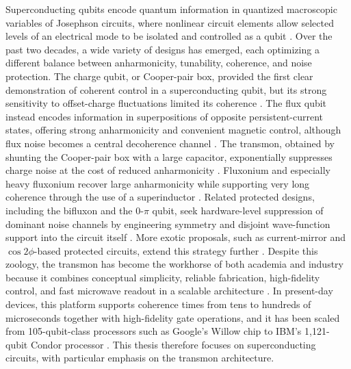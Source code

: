 Superconducting qubits encode quantum information in quantized macroscopic variables of Josephson circuits, where nonlinear circuit elements allow selected levels of an electrical mode to be isolated and controlled as a qubit \cite{Krantz2019,Kjaergaard2020}. Over the past two decades, a wide variety of designs has emerged, each optimizing a different balance between anharmonicity, tunability, coherence, and noise protection. The charge qubit, or Cooper-pair box, provided the first clear demonstration of coherent control in a superconducting qubit, but its strong sensitivity to offset-charge fluctuations limited its coherence \cite{Nakamura1999,Pashkin2009}. The flux qubit instead encodes information in superpositions of opposite persistent-current states, offering strong anharmonicity and convenient magnetic control, although flux noise becomes a central decoherence channel \cite{Mooij1999,Yan2016}. The transmon, obtained by shunting the Cooper-pair box with a large capacitor, exponentially suppresses charge noise at the cost of reduced anharmonicity \cite{Koch2007,Houck2009}. Fluxonium and especially heavy fluxonium recover large anharmonicity while supporting very long coherence through the use of a superinductor \cite{Manucharyan2009,Zhang2021}. Related protected designs, including the bifluxon and the 0-$\pi$ qubit, seek hardware-level suppression of dominant noise channels by engineering symmetry and disjoint wave-function support into the circuit itself \cite{Kalashnikov2020,Gyenis2021}. More exotic proposals, such as current-mirror and \(\cos 2\phi\)-based protected circuits, extend this strategy further \cite{Kitaev2006,Smith2020}. Despite this zoology, the transmon has become the workhorse of both academia and industry because it combines conceptual simplicity, reliable fabrication, high-fidelity control, and fast microwave readout in a scalable architecture \cite{Kjaergaard2020,Jiang2025}. In present-day devices, this platform supports coherence times from tens to hundreds of microseconds together with high-fidelity gate operations, and it has been scaled from 105-qubit-class processors such as Google's Willow chip to IBM's 1,121-qubit Condor processor \cite{GoogleQEC2025,IBMCondor2023}. This thesis therefore focuses on superconducting circuits, with particular emphasis on the transmon architecture.

